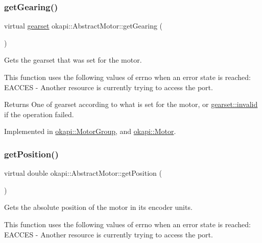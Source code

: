 \subsubsection{\texorpdfstring{getGearing()}{getGearing()}}
{\footnotesize\ttfamily virtual \mbox{\hyperlink{classokapi_1_1AbstractMotor_a88aaa6ea2fa10f5520a537bbf26774d5}{gearset}} okapi\+::\+Abstract\+Motor\+::get\+Gearing (\begin{DoxyParamCaption}{ }\end{DoxyParamCaption})\hspace{0.3cm}{\ttfamily [pure virtual]}}

Gets the gearset that was set for the motor.

This function uses the following values of errno when an error state is reached\+: E\+A\+C\+C\+ES -\/ Another resource is currently trying to access the port.

\begin{DoxyReturn}{Returns}
One of gearset according to what is set for the motor, or \mbox{\hyperlink{classokapi_1_1AbstractMotor_a88aaa6ea2fa10f5520a537bbf26774d5afedb2d84cafe20862cb4399751a8a7e3}{gearset\+::invalid}} if the operation failed. 
\end{DoxyReturn}


Implemented in \mbox{\hyperlink{classokapi_1_1MotorGroup_abe6d309d6e883b469997c4ddc4584834}{okapi\+::\+Motor\+Group}}, and \mbox{\hyperlink{classokapi_1_1Motor_a4dbe4aec1a4c6cb1cad659bada1ab8ed}{okapi\+::\+Motor}}.

\mbox{\label{classokapi_1_1AbstractMotor_a4f9d74e054600c5ddb49ebb8164004d3}} 
\subsubsection{\texorpdfstring{getPosition()}{getPosition()}}
{\footnotesize\ttfamily virtual double okapi\+::\+Abstract\+Motor\+::get\+Position (\begin{DoxyParamCaption}{ }\end{DoxyParamCaption})\hspace{0.3cm}{\ttfamily [pure virtual]}}

Gets the absolute position of the motor in its encoder units.

This function uses the following values of errno when an error state is reached\+: E\+A\+C\+C\+ES -\/ Another resource is currently trying to access the port.

